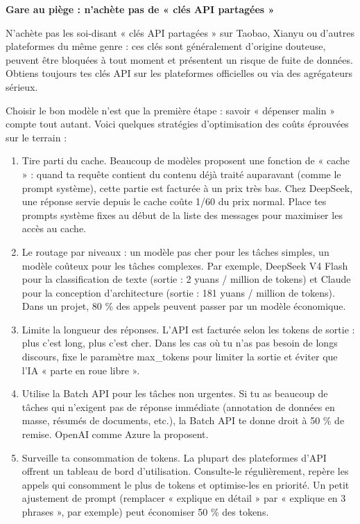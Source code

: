 \textbf{Gare au piège : n'achète pas de « clés API partagées »}\par

N'achète pas les soi-disant « clés API partagées » sur Taobao, Xianyu ou d'autres plateformes du même genre : ces clés sont généralement d'origine douteuse, peuvent être bloquées à tout moment et présentent un risque de fuite de données. Obtiens toujours tes clés API sur les plateformes officielles ou via des agrégateurs sérieux.


Choisir le bon modèle n'est que la première étape : savoir « dépenser malin » compte tout autant. Voici quelques stratégies d'optimisation des coûts éprouvées sur le terrain :

\begin{enumerate}
  \item Tire parti du cache. Beaucoup de modèles proposent une fonction de « cache » : quand ta requête contient du contenu déjà traité auparavant (comme le prompt système), cette partie est facturée à un prix très bas. Chez DeepSeek, une réponse servie depuis le cache coûte 1/60 du prix normal. Place tes prompts système fixes au début de la liste des messages pour maximiser les accès au cache.
  \item Le routage par niveaux : un modèle pas cher pour les tâches simples, un modèle coûteux pour les tâches complexes. Par exemple, DeepSeek V4 Flash pour la classification de texte (sortie : 2 yuans / million de tokens) et Claude pour la conception d'architecture (sortie : 181 yuans / million de tokens). Dans un projet, 80 \% des appels peuvent passer par un modèle économique.
  \item Limite la longueur des réponses. L'API est facturée selon les tokens de sortie : plus c'est long, plus c'est cher. Dans les cas où tu n'as pas besoin de longs discours, fixe le paramètre max\_tokens pour limiter la sortie et éviter que l'IA « parte en roue libre ».
  \item Utilise la Batch API pour les tâches non urgentes. Si tu as beaucoup de tâches qui n'exigent pas de réponse immédiate (annotation de données en masse, résumés de documents, etc.), la Batch API te donne droit à 50 \% de remise. OpenAI comme Azure la proposent.
  \item Surveille ta consommation de tokens. La plupart des plateformes d'API offrent un tableau de bord d'utilisation. Consulte-le régulièrement, repère les appels qui consomment le plus de tokens et optimise-les en priorité. Un petit ajustement de prompt (remplacer « explique en détail » par « explique en 3 phrases », par exemple) peut économiser 50 \% des tokens.
\end{enumerate}

